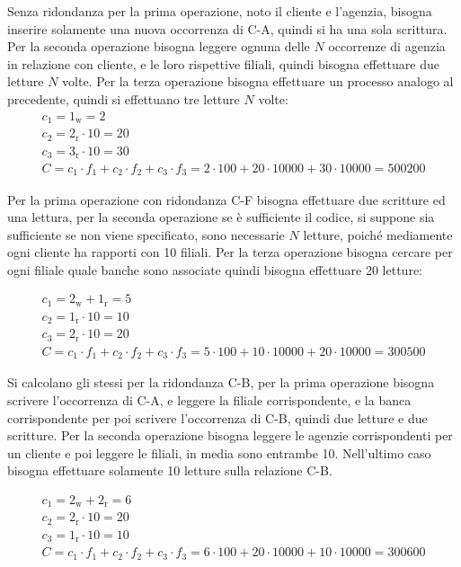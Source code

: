 \documentclass{article}
\begin{document}
Senza ridondanza per la prima operazione, noto il cliente e l'agenzia, bisogna inserire solamente una nuova occorrenza di C-A, quindi si ha una sola scrittura. Per la seconda operazione bisogna leggere ognuna delle $N$ occorrenze di agenzia in relazione con cliente, e le loro rispettive filiali, quindi bisogna effettuare due letture $N$ volte. Per la terza operazione bisogna effettuare un processo analogo al precedente, quindi si effettuano tre letture $N$ volte:
\begin{gather*}
    c_1=1_\text{w}=2\\
    c_2=2_\text{r}\cdot10=20\\
    c_3=3_\text{r}\cdot10=30\\
    C=c_1\cdot f_1+c_2\cdot f_2+c_3\cdot f_3=2\cdot100+20\cdot10000+30\cdot10000=500200
\end{gather*}



Per la prima operazione con ridondanza C-F bisogna effettuare due scritture ed una lettura, per la seconda operazione se è sufficiente il codice, si suppone sia 
sufficiente se non viene specificato, sono necessarie $N$ letture, poiché mediamente ogni cliente ha rapporti con 10 filiali. Per la terza operazione bisogna 
cercare per ogni filiale quale banche sono associate quindi bisogna effettuare 20 letture:

\begin{gather*}
    c_1=2_\text{w}+1_\text{r}=5\\
    c_2=1_\text{r}\cdot10=10\\
    c_3=2_\text{r}\cdot10=20\\
    C=c_1\cdot f_1+c_2\cdot f_2+c_3\cdot f_3=5\cdot100+10\cdot10000+20\cdot10000=300500
\end{gather*}

Si calcolano gli stessi per la ridondanza C-B, per la prima operazione bisogna scrivere l'occorrenza di C-A, e leggere la filiale corrispondente, e la banca corrispondente 
per poi scrivere l'occorrenza di C-B, quindi due letture e due scritture. Per la seconda operazione bisogna leggere le agenzie corrispondenti per un cliente e poi leggere 
le filiali, in media sono entrambe 10. Nell'ultimo caso bisogna effettuare solamente 10 letture sulla relazione C-B. 

\begin{gather*}
    c_1=2_\text{w}+2_\text{r}=6\\
    c_2=2_\text{r}\cdot10=20\\
    c_3=1_\text{r}\cdot10=10\\
    C=c_1\cdot f_1+c_2\cdot f_2+c_3\cdot f_3=6\cdot100+20\cdot10000+10\cdot10000=300600
\end{gather*}
\end{document}
